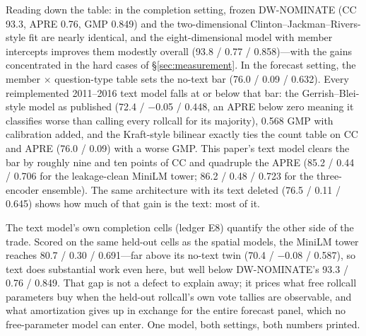 \documentclass[11pt]{article}
\begin{document}
Reading down the table: in the completion setting, frozen DW-NOMINATE
(CC 93.3, APRE 0.76, GMP 0.849) and the two-dimensional
Clinton--Jackman--Rivers-style fit are nearly identical, and the
eight-dimensional model with member intercepts improves them modestly
overall (93.8 / 0.77 / 0.858)---with the gains concentrated in the hard
cases of \S\ref{sec:measurement}. In the forecast setting, the
member $\times$ question-type table sets the no-text bar (76.0 / 0.09 /
0.632). Every reimplemented 2011--2016 text model falls at or below
that bar: the Gerrish--Blei-style model as published (72.4 / $-$0.05 /
0.448, an APRE below zero meaning it classifies worse than calling
every rollcall for its majority), 0.568 GMP with calibration added, and
the Kraft-style bilinear exactly ties the count table on CC and APRE
(76.0 / 0.09) with a worse GMP. This paper's text model clears the bar by roughly nine and ten points of CC and
quadruple the APRE (85.2 / 0.44 / 0.706 for the leakage-clean
MiniLM tower; 86.2 / 0.48 / 0.723 for the three-encoder ensemble). The
same architecture with its text deleted (76.5 / 0.11 / 0.645) shows how
much of that gain is the text: most of it.

The text model's own completion cells (ledger E8) quantify the other
side of the trade. Scored on the same held-out cells as the spatial
models, the MiniLM tower reaches 80.7 / 0.30 / 0.691---far above its
no-text twin (70.4 / $-$0.08 / 0.587), so text does substantial work
even here, but well below DW-NOMINATE's 93.3 / 0.76 / 0.849. That gap
is not a defect to explain away; it prices what free rollcall
parameters buy when the held-out rollcall's own vote tallies are
observable, and what amortization gives up in exchange for the entire
forecast panel, which no free-parameter model can enter. One model,
both settings, both numbers printed.
\end{document}
